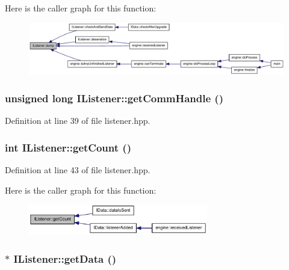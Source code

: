 Here is the caller graph for this function:\nopagebreak
\begin{figure}[H]
\begin{center}
\leavevmode
\includegraphics[width=420pt]{class_i_listener_ae53c9b5bd1067445dd09804efd04ea5c_icgraph}
\end{center}
\end{figure}
\hypertarget{class_i_listener_ad1ce06a966f81c212179acb6da9c4b9d}{
\subsubsection[{getCommHandle}]{\setlength{\rightskip}{0pt plus 5cm}unsigned long IListener::getCommHandle ()}}
\label{class_i_listener_ad1ce06a966f81c212179acb6da9c4b9d}


Definition at line 39 of file listener.hpp.\hypertarget{class_i_listener_a3ccdeeabec88b3f0532aa2ced78797e8}{
\subsubsection[{getCount}]{\setlength{\rightskip}{0pt plus 5cm}int IListener::getCount ()}}
\label{class_i_listener_a3ccdeeabec88b3f0532aa2ced78797e8}


Definition at line 43 of file listener.hpp.

Here is the caller graph for this function:\nopagebreak
\begin{figure}[H]
\begin{center}
\leavevmode
\includegraphics[width=222pt]{class_i_listener_a3ccdeeabec88b3f0532aa2ced78797e8_icgraph}
\end{center}
\end{figure}
\hypertarget{class_i_listener_a26d2796b0c0f2fb59203140ddb0ee468}{
\subsubsection[{getData}]{$\ast$ IListener::getData ()}}
\label{class_i_listener_a26d2796b0c0f2fb59203140ddb0ee468}


